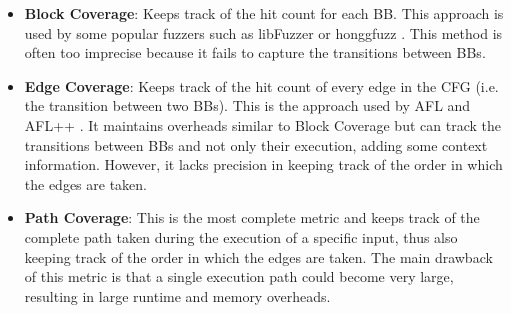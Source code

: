     \begin{itemize}
        \item \textbf{Block Coverage}: Keeps track of the hit count for each \gls{BB}. This approach is used by some
            popular fuzzers such as libFuzzer or honggfuzz \cite{CollAFL}. This method is often too imprecise because
            it fails to capture the transitions between BBs.
        \item \textbf{Edge Coverage}: Keeps track of the hit count of every edge in the \gls{CFG} (i.e. the transition between two \gls{BB}s).
            This is the approach used by AFL and AFL++ \cite{aflplusplus}. It maintains overheads similar to Block Coverage but can
            track the transitions between \gls{BB}s and not only their execution, adding some context information.
            However, it lacks precision in keeping track of the order in which the edges are taken.
        \item \textbf{Path Coverage}: This is the most complete metric and keeps track of the complete path taken during the execution
            of a specific input, thus also keeping track of the order in which the edges are taken.
            The main drawback of this metric is that a single execution path could become very large, resulting in
            large runtime and memory overheads.
    \end{itemize}

